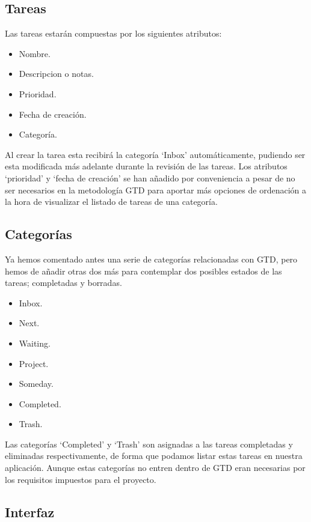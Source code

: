 \documentclass[parskip=half*]{scrartcl}
\begin{document}
\subsection{Tareas}

Las tareas estar\'an compuestas por los siguientes atributos:
\begin{itemize}
	\item Nombre.
	\item Descripcion o notas.
	\item Prioridad.
	\item Fecha de creaci\'on.
	\item Categor\'ia.
\end{itemize}

Al crear la tarea esta recibir\'a la categor\'ia `Inbox' autom\'aticamente, pudiendo ser esta modificada m\'as adelante durante la revisi\'on de las tareas. Los atributos `prioridad' y `fecha de creaci\'on' se han a\~nadido por conveniencia a pesar de no ser necesarios en la metodolog\'ia GTD para aportar m\'as opciones de ordenaci\'on a la hora de visualizar el listado de tareas de una categor\'ia.

\subsection{Categor\'ias}

Ya hemos comentado antes una serie de categor\'ias relacionadas con GTD, pero hemos de a\~nadir otras dos m\'as para contemplar dos posibles estados de las tareas; completadas y borradas.

\begin{itemize}
	\item Inbox.
	\item Next.
	\item Waiting.
	\item Project.
	\item Someday.
	\item Completed.
	\item Trash. 
\end{itemize}

Las categor\'ias `Completed' y `Trash' son asignadas a las tareas completadas y eliminadas respectivamente, de forma que podamos listar estas tareas en nuestra aplicaci\'on. Aunque estas categor\'ias no entren dentro de GTD eran necesarias por los requisitos impuestos para el proyecto.

\subsection{Interfaz}
\end{document}
